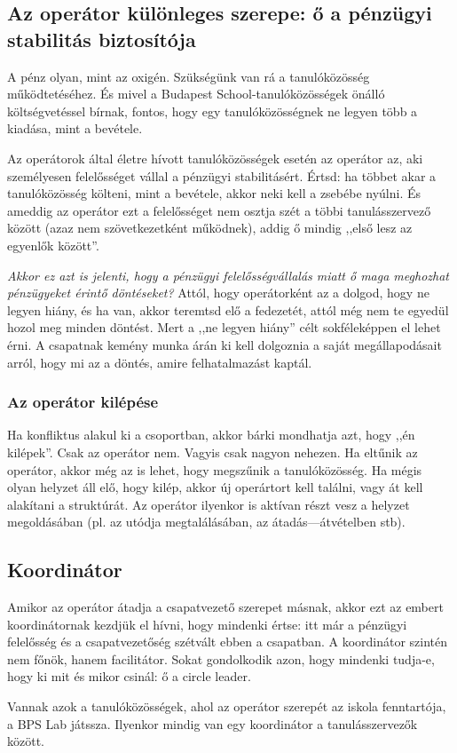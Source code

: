 \hypertarget{az-operator-kulonleges-szerepe-o-a-penzugyi-stabilitas-biztositoja}{%
\subsection{Az operátor különleges szerepe: ő a pénzügyi stabilitás
biztosítója}\label{az-operator-kulonleges-szerepe-o-a-penzugyi-stabilitas-biztositoja}}

A pénz olyan, mint az oxigén. Szükségünk van rá a tanulóközösség
működtetéséhez. És mivel a Budapest School-tanulóközösségek önálló
költségvetéssel bírnak, fontos, hogy egy tanulóközösségnek ne legyen
több a kiadása, mint a bevétele.

Az operátorok által életre hívott tanulóközösségek esetén az operátor
az, aki személyesen felelősséget vállal a pénzügyi stabilitásért. Értsd:
ha többet akar a tanulóközösség költeni, mint a bevétele, akkor neki
kell a zsebébe nyúlni. És ameddig az operátor ezt a felelősséget nem
osztja szét a többi tanulásszervező között (azaz nem szövetkezetként
működnek), addig ő mindig
,,első lesz az egyenlők között''.

\emph{Akkor ez azt is jelenti, hogy a pénzügyi felelősségvállalás
miatt ő maga meghozhat pénzügyeket érintő döntéseket?} Attól, hogy
operátorként az a dolgod, hogy ne legyen hiány, és ha van, akkor
teremtsd elő a fedezetét, attól még nem te egyedül hozol meg minden döntést.
Mert a ,,ne legyen hiány'' célt sokféleképpen el lehet érni. A csapatnak
kemény munka árán ki kell dolgoznia a saját megállapodásait arról, hogy
mi az a döntés, amire felhatalmazást kaptál.

\hypertarget{az-operator-kilepese}{%
\subsubsection{Az operátor kilépése}\label{az-operator-kilepese}}

Ha konfliktus alakul ki a csoportban, akkor bárki mondhatja azt, hogy
,,én kilépek''. Csak az operátor nem. Vagyis csak nagyon nehezen. Ha
eltűnik az operátor, akkor még az is lehet, hogy megszűnik a
tanulóközösség. Ha mégis olyan helyzet áll elő, hogy kilép, akkor új
operártort kell találni, vagy át kell alakítani a struktúrát. Az operátor
ilyenkor is aktívan részt vesz a helyzet megoldásában (pl. az utódja
megtalálásában, az átadás---átvételben stb).

\hypertarget{koordinator}{%
\subsection{Koordinátor}\label{koordinator}}

Amikor az operátor átadja a csapatvezető szerepet másnak, akkor ezt az
embert koordinátornak kezdjük el hívni, hogy mindenki értse: itt már a
pénzügyi felelősség és a csapatvezetőség szétvált ebben a csapatban. A
koordinátor szintén nem főnök, hanem facilitátor. Sokat gondolkodik
azon, hogy mindenki tudja-e, hogy ki mit és mikor csinál: ő a circle
leader.

Vannak azok a tanulóközösségek, ahol az operátor szerepét az iskola
fenntartója, a BPS Lab
játssza.
Ilyenkor mindig van egy koordinátor a tanulásszervezők között.
